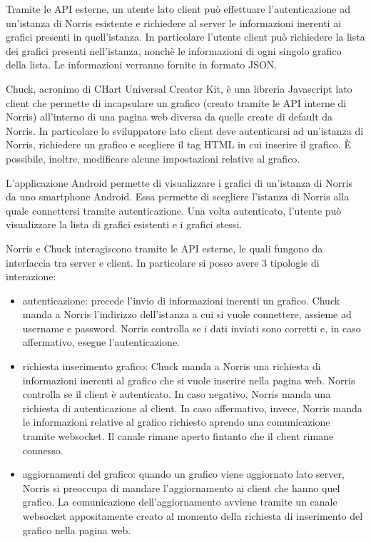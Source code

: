    Tramite le API esterne, un utente lato client può effettuare l'autenticazione ad un'istanza di Norris esistente e richiedere al server le informazioni inerenti ai grafici presenti in quell'istanza. In particolare l'utente client può richiedere la lista dei grafici presenti nell'istanza, nonchè le informazioni di ogni singolo grafico della lista. Le informazioni verranno fornite in formato JSON.

    Chuck, acronimo di CHart Universal Creator Kit, è una libreria Javascript lato client che permette di incapsulare un grafico (creato tramite le API interne di Norris) all'interno di una pagina web diversa da quelle create di default da Norris. In particolare lo sviluppatore lato client deve autenticarsi ad un'istanza di Norris, richiedere un grafico e scegliere il tag HTML in cui inserire il grafico. È possibile, inoltre, modificare alcune impostazioni relative al grafico.
    
    L'applicazione Android permette di visualizzare i grafici di un'istanza di Norris da uno smartphone Android. Essa permette di scegliere l'istanza di Norris alla quale connettersi tramite autenticazione. Una volta autenticato, l'utente può visualizzare la lista di grafici esistenti e i grafici stessi.
        
    Norris e Chuck interagiscono tramite le API esterne, le quali fungono da interfaccia tra server e client. In particolare si posso avere 3 tipologie di interazione:
    \begin{itemize}
        \item autenticazione: precede l'invio di informazioni inerenti un grafico. Chuck manda a Norris l'indirizzo dell'istanza a cui si vuole connettere, assieme ad username e password. Norris controlla se i dati inviati sono corretti e, in caso affermativo, esegue l'autenticazione.
        \item richiesta inserimento grafico: Chuck manda a Norris una richiesta di informazioni inerenti al grafico che si vuole inserire nella pagina web. Norris controlla se il client è autenticato. In caso negativo, Norris manda una richiesta di autenticazione al client. In caso affermativo, invece, Norris manda le informazioni relative al grafico richiesto aprendo una comunicazione tramite websocket. Il canale rimane aperto fintanto che il client rimane connesso.
        \item aggiornamenti del grafico: quando un grafico viene aggiornato lato server, Norris si preoccupa di mandare l'aggiornamento ai client che hanno quel grafico. La comunicazione dell'aggiornamento avviene tramite un canale websocket appositamente creato al momento della richiesta di inserimento del grafico nella pagina web.
    \end{itemize}
    
